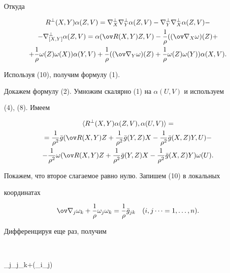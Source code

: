 Откуда 


\begin{gather*} 


R^\bot(X,Y)\alpha(Z,V)=\na^\bot_X\na^\bot_Y\alpha(Z,V)- 


\na^\bot_Y\na^\bot_X\alpha(Z,V)-\\ 


-\na^\bot_{[X,Y]}\alpha(Z,V)=\alpha(\ov R(X,Y)Z,V)-\frac{1}{\rho} 


((\ov\na_X\omega)(Z)+\\ 


+\frac{1}{\rho}\omega(Z)\omega(X))\alpha(Y,V)+\frac{1}{\rho} 


((\ov\na_Y\omega)(Z)+ 


\frac{1}{\rho}\omega(Z)\omega(Y))\alpha(X,V). 


\end{gather*} 


Используя (10), получим формулу (1). 


 


Докажем формулу (2). Умножим скалярно (1) на $\alpha(U,V)$ и используем 


(4), (8). Имеем 


\begin{gather*} 


\la R^\bot(X,Y)\alpha(Z,V),\alpha(U,V)\ra=\\ 


=\frac{1}{\rho^2}\Bar g(\ov R(X,Y)Z+\frac{1}{\rho^2}\Bar g(Y,Z)X- 


\frac{1}{\rho^2}\Bar g(X,Z)Y,U)-\\ 


-\frac{1}{\rho^2}\omega(\ov R(X,Y)Z+\frac{1}{\rho^2}\Bar g(Y,Z)X- 


\frac{1}{\rho^2}\Bar g(X,Z)Y)\omega(U). 


\end{gather*} 


Покажем, что второе слагаемое равно нулю. Запишем (10) в локальных 


координатах 


$$ 


\ov\na_j\omega_k+\frac{1}{\rho}\omega_j\omega_k= 


\frac{1}{\rho}\Bar g_{jk} \quad (i,j\dots=1,\dotsc,n). 


$$ 


Дифференцируя еще раз, получим 


$$ 


\ov\na_j\ov\na_j\omega_k+(\ov\na_i\omega_j) 



